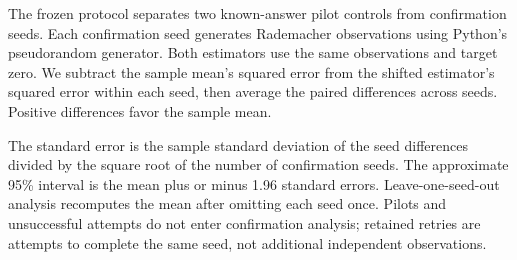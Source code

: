 The frozen protocol separates two known-answer pilot controls from
 confirmation seeds. Each confirmation seed generates
 Rademacher observations using Python's pseudorandom
generator. Both estimators use the same observations and target zero. We
subtract the sample mean's squared error from the shifted estimator's squared
error within each seed, then average the paired differences across seeds.
Positive differences favor the sample mean.

The standard error is the sample standard deviation of the seed differences
divided by the square root of the number of confirmation seeds. The approximate
95\% interval is the mean plus or minus 1.96 standard errors. Leave-one-seed-out
analysis recomputes the mean after omitting each seed once. Pilots and unsuccessful
attempts do not enter confirmation analysis; retained retries are attempts to
complete the same seed, not additional independent observations.
